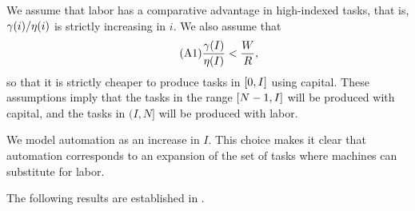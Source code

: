 \documentclass[12pt]{article}
\theoremstyle{definition}
\begin{document}
We assume that labor has a comparative advantage in high-indexed tasks, that is, $\gamma{\left( i \right)}/\eta{\left( i \right)}$ is strictly increasing in $i$. We also assume that 
\begin{equation}
    \tag{A1}
    \label{eq_tm_ass1}
    \frac{\gamma{\left( I \right)}}{\eta{\left( I \right)}} < \frac{W}{R},
\end{equation}
so that it is strictly cheaper to produce tasks in $\left[ 0, I \right]$ using capital. These assumptions imply that the tasks in the range $\left[ N-1, I \right]$ will be produced with capital, and the tasks in $(I, N]$ will be produced with labor. 

We model automation as an increase in $I$. This choice makes it clear that automation corresponds to an expansion of the set of tasks where machines can substitute for labor. 

The following results are established in \citet{acemogluRaceManMachine2018}.
\end{document}
